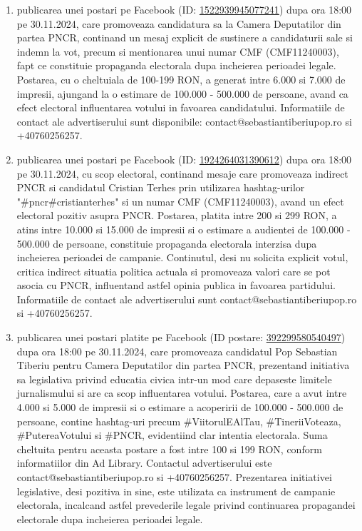 \documentclass[a4paper,12pt]{article}
\begin{document}
\begin{enumerate}[leftmargin=*, label=\arabic*.)]
    \item publicarea unei postari pe Facebook (ID: \href{https://www.facebook.com/ads/library/?id=1522939945077241}{1522939945077241}) dupa ora 18:00 pe 30.11.2024, care promoveaza candidatura sa la Camera Deputatilor din partea PNCR,  continand un mesaj explicit de sustinere a candidaturii sale si indemn la vot,  precum si mentionarea unui numar CMF (CMF11240003), fapt ce constituie propaganda electorala dupa incheierea perioadei legale. Postarea, cu o cheltuiala de 100-199 RON, a generat intre 6.000 si 7.000 de impresii, ajungand la o estimare de 100.000 - 500.000 de persoane, avand ca efect electoral influentarea votului in favoarea candidatului.  Informatiile de contact ale advertiserului sunt disponibile: contact@sebastiantiberiupop.ro si +40760256257.
    \item publicarea unei postari pe Facebook (ID: \href{https://www.facebook.com/ads/library/?id=1924264031390612}{1924264031390612}) dupa ora 18:00 pe 30.11.2024, cu scop electoral,  continand  mesaje care promoveaza indirect PNCR si candidatul Cristian Terhes prin utilizarea hashtag-urilor "\#pncr\#cristianterhes" si un numar CMF (CMF11240003),  avand un efect electoral pozitiv asupra PNCR. Postarea, platita intre 200 si 299 RON, a atins intre 10.000 si 15.000 de impresii si o estimare a audientei de 100.000 - 500.000 de persoane,  constituie propaganda electorala interzisa dupa incheierea perioadei de campanie.  Continutul, desi nu solicita explicit votul,  critica indirect situatia politica actuala si promoveaza valori care se pot asocia cu PNCR, influentand astfel opinia publica in favoarea partidului.  Informatiile de contact ale advertiserului sunt contact@sebastiantiberiupop.ro si +40760256257.
    \item publicarea unei postari platite pe Facebook (ID postare: \href{https://www.facebook.com/ads/library/?id=392299580540497}{392299580540497}) dupa ora 18:00 pe 30.11.2024, care promoveaza candidatul Pop Sebastian Tiberiu pentru Camera Deputatilor din partea PNCR, prezentand initiativa sa legislativa privind educatia civica intr-un mod care depaseste limitele jurnalismului si are ca scop influentarea votului. Postarea, care a avut intre 4.000 si 5.000 de impresii si o estimare a acoperirii de 100.000 - 500.000 de persoane, contine hashtag-uri precum \#ViitorulEAlTau, \#TineriiVoteaza, \#PutereaVotului si \#PNCR, evidentiind clar intentia electorala.  Suma cheltuita pentru aceasta postare a fost intre 100 si 199 RON, conform informatiilor din Ad Library.  Contactul advertiserului este contact@sebastiantiberiupop.ro si +40760256257.  Prezentarea initiativei legislative, desi pozitiva in sine, este utilizata ca instrument de campanie electorala, incalcand astfel prevederile legale privind continuarea propagandei electorale dupa incheierea perioadei legale.

\end{enumerate}
\end{document}
